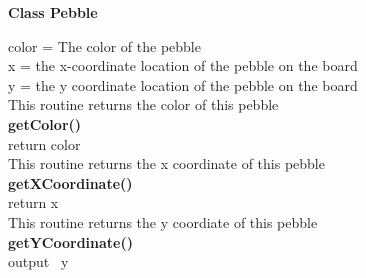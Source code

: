 \documentclass[12pt]{article}
\begin{document}
\begin{paragraph}
\begin{flushleft}
\textbf{Class Pebble}\\
\end{flushleft}
\indent	color = The color of the pebble\\
\indent	x = the x-coordinate location of the pebble on the board\\
\indent	y = the y coordinate location of the pebble on the board\\
\linebreak
\indent	This routine returns the color of this pebble\\
\indent	\textbf{getColor()}\\
\indent	\indent	return color\\
\linebreak
\indent	This routine returns the x coordinate of this pebble\\
\indent	\textbf{getXCoordinate()}\\
\indent	\indent	return x\\
\linebreak
\indent	This routine returns the y coordiate of this pebble\\
\indent	\textbf{getYCoordinate()}\\
\indent \indent output~ y
\end{paragraph}  
\end{document}
